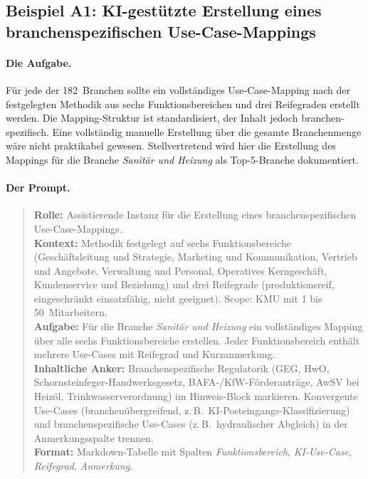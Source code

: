 \documentclass[a4paper,11pt]{article}
\begin{document}
\subsection{Beispiel A1: KI-gestützte Erstellung eines branchenspezifischen Use-Case-Mappings}

\paragraph{Die Aufgabe.}
Für jede der 182~Branchen sollte ein vollständiges Use-Case-Mapping
nach der festgelegten Methodik aus sechs Funktionsbereichen und drei
Reifegraden erstellt werden. Die Mapping-Struktur ist standardisiert,
der Inhalt jedoch branchen-spezifisch. Eine vollständig manuelle
Erstellung über die gesamte Branchenmenge wäre nicht praktikabel
gewesen. Stellvertretend wird hier die Erstellung des Mappings für die
Branche \emph{Sanitär und Heizung} als Top-5-Branche dokumentiert.

\paragraph{Der Prompt.}
\begin{quote}
\textbf{Rolle:} Assistierende Instanz für die Erstellung eines
branchen\-spezifischen Use-Case-Mappings.\\
\textbf{Kontext:} Methodik festgelegt auf sechs Funktionsbereiche
(Geschäftsleitung und Strategie, Marketing und Kommunikation, Vertrieb
und Angebote, Verwaltung und Personal, Operatives Kerngeschäft,
Kundenservice und Beziehung) und drei Reifegrade (produktionsreif,
eingeschränkt einsatzfähig, nicht geeignet). Scope: KMU mit 1 bis
50~Mitarbeitern.\\
\textbf{Aufgabe:} Für die Branche \emph{Sanitär und Heizung} ein
vollständiges Mapping über alle sechs Funktionsbereiche erstellen.
Jeder Funktionsbereich enthält mehrere Use-Cases mit Reifegrad und
Kurz\-anmerkung.\\
\textbf{Inhaltliche Anker:} Branchen\-spezifische Regulatorik (GEG,
HwO, Schornsteinfeger-Handwerksgesetz, BAFA-/KfW-Förder\-anträge,
AwSV bei Heizöl, Trinkwasser\-verordnung) im Hinweis-Block markieren.
Konvergente Use-Cases (branchen\-übergreifend, z.\,B.\
KI-Postein\-gangs-Klassifizierung) und branchen\-spezifische Use-Cases
(z.\,B.\ hydraulischer Abgleich) in der Anmerkungs\-spalte trennen.\\
\textbf{Format:} Markdown-Tabelle mit Spalten \emph{Funktionsbereich},
\emph{KI-Use-Case}, \emph{Reifegrad}, \emph{Anmerkung}.
\end{quote}
\end{document}
